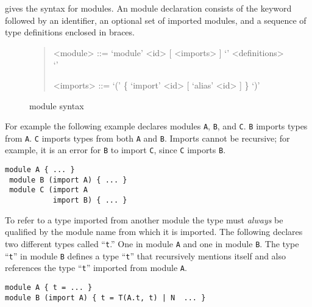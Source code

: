  gives the syntax for modules.
An \asdl{} module declaration consists of the keyword 
followed by an identifier, an optional set of imported modules, and a
sequence of type definitions enclosed in braces.

\begin{figure}[t]
  \begin{quote}
    \begin{grammar}
      <module>  ::=  `module' <id> [ <imports> ] `{' <definitions> `}'

      <imports> ::=  `(' \{ `import' <id> [ `alias' <id> ] \} `)'
    \end{grammar}
  \end{quote}
  \caption{\asdl{} module syntax}
  \label{fig:module-syntax}
\end{figure}%

For example the
following example declares modules \lstinline[language=ASDL]!A!,
\lstinline[language=ASDL]!B!, and \lstinline[language=ASDL]!C!.
\lstinline[language=ASDL]!B! imports types from \lstinline[language=ASDL]!A!.
\lstinline[language=ASDL]!C! imports types from both \lstinline[language=ASDL]!A! and
\lstinline[language=ASDL]!B!.
Imports cannot be recursive; for example, it is an error for \lstinline[language=ASDL]!B! to
import \lstinline[language=ASDL]!C!, since \lstinline[language=ASDL]!C!
imports \lstinline[language=ASDL]!B!.
\begin{code}\begin{lstlisting}[language=ASDL]
 module A { ... } 
 module B (import A) { ... }
 module C (import A 
           import B) { ... }
\end{lstlisting}\end{code}%

To refer to a type imported from another module the type must
\emph{always} be qualified by the module name from which it is
imported.
The following declares two different types called ``\texttt{t}.''
One in module \texttt{A} and one in module \texttt{B}.
The type ``\texttt{t}'' in module \texttt{B} defines a type ``\texttt{t}'' that
recursively mentions itself and also references the type ``\texttt{t}'' imported
from module \texttt{A}.
\begin{code}\begin{lstlisting}[language=ASDL]
module A { t = ... } 
module B (import A) { t = T(A.t, t) | N  ... }
\end{lstlisting}\end{code}%

